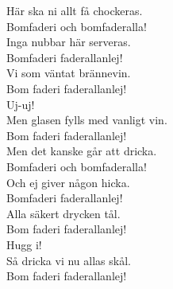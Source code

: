 \documentclass[a6paper, 10pt, twoside]{article}
\begin{document}
\noindent
\begin{center}
\end{center}
\begin{lyrics}
Här ska ni allt få chockeras.\\
Bomfaderi och bomfaderalla!\\
Inga nubbar här serveras.\\
Bomfaderi faderallanlej!
\vspace{5pt}\\
Vi som väntat brännevin.\\
Bom faderi faderallanlej!\\
Uj-uj!\\
Men glasen fylls med vanligt vin.\\
Bom faderi faderallanlej!
\vspace{5pt}\\
Men det kanske går att dricka.\\
Bomfaderi och bomfaderalla!\\
Och ej giver någon hicka.\\
Bomfaderi faderallanlej!
\vspace{5pt}\\
Alla säkert drycken tål.\\
Bom faderi faderallanlej!\\
Hugg i!\\
Så dricka vi nu allas skål.\\
Bom faderi faderallanlej!
\end{lyrics}
\end{document}
